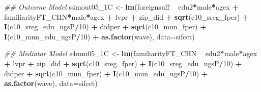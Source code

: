 \documentclass[
]{article}
\newenvironment{Shaded}{\begin{snugshade}}{\end{snugshade}}
\newcommand{\CommentTok}[1]{\textcolor[rgb]{0.56,0.35,0.01}{\textit{#1}}}
\newcommand{\DataTypeTok}[1]{\textcolor[rgb]{0.13,0.29,0.53}{#1}}
\newcommand{\DecValTok}[1]{\textcolor[rgb]{0.00,0.00,0.81}{#1}}
\newcommand{\KeywordTok}[1]{\textcolor[rgb]{0.13,0.29,0.53}{\textbf{#1}}}
\newcommand{\NormalTok}[1]{#1}
\newcommand{\OperatorTok}[1]{\textcolor[rgb]{0.81,0.36,0.00}{\textbf{#1}}}
\newcommand{\StringTok}[1]{\textcolor[rgb]{0.31,0.60,0.02}{#1}}
\begin{document}
\begin{Shaded}
\begin{Highlighting}[]
\CommentTok{## Outcome Model }
\NormalTok{s4mout05_1C <-}\StringTok{ }\KeywordTok{lm}\NormalTok{(foreignsuff  }\OperatorTok{~}\StringTok{ }\NormalTok{edu2}\OperatorTok{*}\NormalTok{male}\OperatorTok{*}\NormalTok{agex }\OperatorTok{+}\StringTok{ }\NormalTok{familiarityFT_CHN}\OperatorTok{*}\NormalTok{male}\OperatorTok{*}\NormalTok{agex }\OperatorTok{+}\StringTok{ }\NormalTok{lvpr }\OperatorTok{+}\StringTok{  }
\StringTok{                    }\NormalTok{zip_did }\OperatorTok{+}\StringTok{ }\KeywordTok{sqrt}\NormalTok{(c10_sreg_fper) }\OperatorTok{+}\StringTok{ }\KeywordTok{I}\NormalTok{(c10_sreg_edu_ugsP}\OperatorTok{/}\DecValTok{10}\NormalTok{) }\OperatorTok{+}\StringTok{ }
\StringTok{                    }\NormalTok{didper }\OperatorTok{+}\StringTok{ }\KeywordTok{sqrt}\NormalTok{(c10_mun_fper) }\OperatorTok{+}\StringTok{ }\KeywordTok{I}\NormalTok{(c10_mun_edu_ugsP}\OperatorTok{/}\DecValTok{10}\NormalTok{) }\OperatorTok{+}\StringTok{ }
\StringTok{                    }\KeywordTok{as.factor}\NormalTok{(wave), }\DataTypeTok{data=}\NormalTok{sifcct)}

\CommentTok{## Mediator Model}
\NormalTok{s4mm05_1C <-}\StringTok{ }\KeywordTok{lm}\NormalTok{(familiarityFT_CHN  }\OperatorTok{~}\StringTok{ }\NormalTok{edu2}\OperatorTok{*}\NormalTok{male}\OperatorTok{*}\NormalTok{agex }\OperatorTok{+}\StringTok{ }\NormalTok{lvpr }\OperatorTok{+}\StringTok{  }
\StringTok{                  }\NormalTok{zip_did }\OperatorTok{+}\StringTok{ }\KeywordTok{sqrt}\NormalTok{(c10_sreg_fper) }\OperatorTok{+}\StringTok{ }\KeywordTok{I}\NormalTok{(c10_sreg_edu_ugsP}\OperatorTok{/}\DecValTok{10}\NormalTok{) }\OperatorTok{+}\StringTok{ }
\StringTok{                  }\NormalTok{didper }\OperatorTok{+}\StringTok{ }\KeywordTok{sqrt}\NormalTok{(c10_mun_fper) }\OperatorTok{+}\StringTok{ }\KeywordTok{I}\NormalTok{(c10_mun_edu_ugsP}\OperatorTok{/}\DecValTok{10}\NormalTok{) }\OperatorTok{+}\StringTok{ }
\StringTok{                  }\KeywordTok{as.factor}\NormalTok{(wave), }\DataTypeTok{data=}\NormalTok{sifcct)}


\end{Highlighting}
\end{Shaded}
\end{document}

